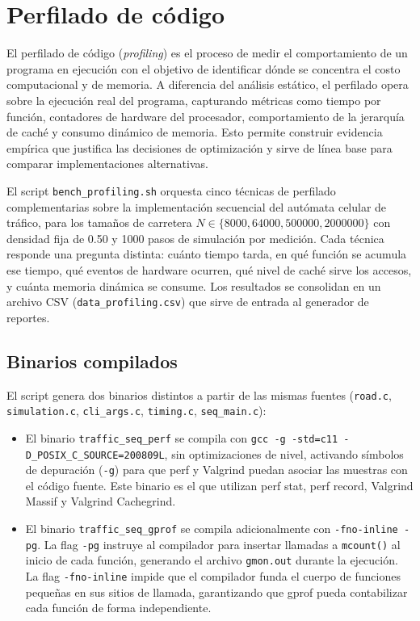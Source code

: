
\section{Perfilado de código}

El perfilado de código (\textit{profiling}) es el proceso de medir el comportamiento
de un programa en ejecución con el objetivo de identificar dónde se concentra el
costo computacional y de memoria.
A diferencia del análisis estático, el perfilado opera sobre la ejecución real del
programa, capturando métricas como tiempo por función, contadores de hardware del
procesador, comportamiento de la jerarquía de caché y consumo dinámico de memoria.
Esto permite construir evidencia empírica que justifica las decisiones de optimización
y sirve de línea base para comparar implementaciones alternativas.

El script \texttt{bench\_profiling.sh} orquesta cinco técnicas de perfilado
complementarias sobre la implementación secuencial del autómata celular de tráfico,
para los tamaños de carretera $N \in \{8000, 64000, 500000, 2000000\}$ con densidad
fija de 0.50 y 1000 pasos de simulación por medición.
Cada técnica responde una pregunta distinta: cuánto tiempo tarda, en qué función
se acumula ese tiempo, qué eventos de hardware ocurren, qué nivel de caché sirve
los accesos, y cuánta memoria dinámica se consume.
Los resultados se consolidan en un archivo CSV (\texttt{data\_profiling.csv}) que
sirve de entrada al generador de reportes.


\subsection{Binarios compilados}

El script genera dos binarios distintos a partir de las mismas fuentes
(\texttt{road.c}, \texttt{simulation.c}, \texttt{cli\_args.c}, \texttt{timing.c},
\texttt{seq\_main.c}):

\begin{itemize}
    \item El binario \texttt{traffic\_seq\_perf} se compila con
        \texttt{gcc -g -std=c11 -D\_POSIX\_C\_SOURCE=200809L}, sin optimizaciones
        de nivel, activando símbolos de depuración (\texttt{-g}) para que perf y
        Valgrind puedan asociar las muestras con el código fuente.
        Este binario es el que utilizan perf stat, perf record, Valgrind Massif y
        Valgrind Cachegrind.

    \item El binario \texttt{traffic\_seq\_gprof} se compila adicionalmente con
        \texttt{-fno-inline -pg}.
        La flag \texttt{-pg} instruye al compilador para insertar llamadas a
        \texttt{mcount()} al inicio de cada función, generando el archivo
        \texttt{gmon.out} durante la ejecución.
        La flag \texttt{-fno-inline} impide que el compilador funda el cuerpo de
        funciones pequeñas en sus sitios de llamada, garantizando que gprof pueda
        contabilizar cada función de forma independiente.
\end{itemize}


